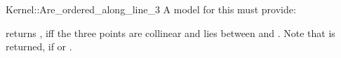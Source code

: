 \begin{ccRefFunctionObjectConcept}{Kernel::Are_ordered_along_line_3}
A model for this must provide:


         {returns , iff the three points are collinear and 
           lies between  and .
          Note that  is returned, if  or
          .}

\ccIsModel{}

\end{ccRefFunctionObjectConcept}
